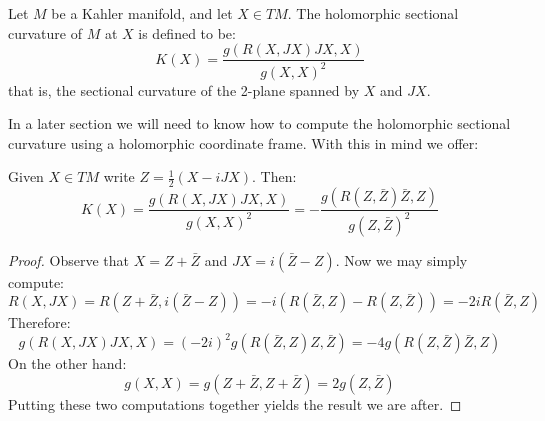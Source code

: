 \begin{definition} Let $M$ be a Kahler manifold, and let $X \in TM$. The holomorphic sectional curvature of $M$ at $X$ is defined to be:
$$ K(X) = \frac{ g( R(X, JX) JX, X) }{ g( X, X )^2 } $$
that is, the sectional curvature of the 2-plane spanned by $X$ and $JX$.
\end{definition}
%
In a later section we will need to know how to compute the holomorphic sectional curvature using a holomorphic coordinate frame.  With this in mind we offer:
%
\begin{lem} Given $X \in TM$ write $Z = \frac{1}{2}( X - i JX )$.  Then:
$$ K(X) = \frac{ g( R(X, JX) JX, X) }{ g( X, X )^2 } = - \frac{ g( R(Z, \bar{Z}) \bar{Z}, Z) }{g( Z, \bar{Z} )^2 } $$
\end{lem}
%
\begin{proof} Observe that $X = Z + \bar{Z}$ and $JX = i( \bar{Z} - Z )$.  Now we may simply compute:
%
$$ R(X, JX) = R( Z + \bar{Z}, i( \bar{Z} - Z ) ) = - i( R( \bar{Z}, Z ) - R( Z, \bar{Z} ) ) = - 2i R( \bar{Z}, Z )$$
%
Therefore:
%
$$ g( R(X, JX) JX, X ) = (-2i)^2 g( R(\bar{Z}, Z) Z, \bar{Z} ) = -4 g( R(Z, \bar{Z}) \bar{Z}, Z ) $$
%
On the other hand:
%
$$ g(X, X) = g(Z + \bar{Z}, Z + \bar{Z}) = 2 g(Z, \bar{Z}) $$
%
Putting these two computations together yields the result we are after.
%
\end{proof}
%

